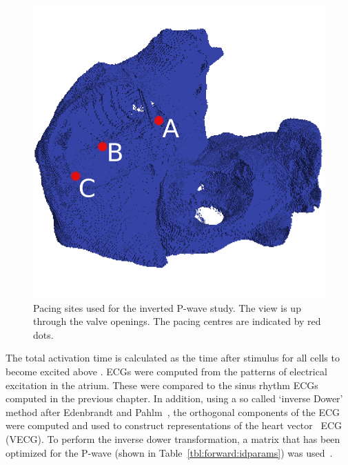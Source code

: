 \begin{figure}
\begin{center}
\includegraphics{figures/forward/inverted_p_wave/pacing_sites}
\end{center}
\caption[Pacing Sites Along The CT]{
\label{fig:forward:inverse:ct_sites}
Pacing sites used for the inverted P-wave study.
The view is up through the valve openings.
The pacing centres are indicated by red dots.
}
\end{figure}

The total activation time is calculated as the time after stimulus for all cells
to become excited above .
ECGs were computed from the patterns of electrical excitation in the atrium.
These were compared to the sinus rhythm ECGs computed in the previous chapter.
In addition, using a so called `inverse Dower' method after Edenbrandt and
Pahlm~\cite{Edenbrandt1988}, the orthogonal components of the ECG were computed
and used to construct representations of the heart
vector~\cite{Frank1956,MacFarlane1989a} ECG (VECG).
To perform the inverse dower transformation, a matrix that has been optimized for
the P-wave (shown in Table~\ref{tbl:forward:idparams}) was
used~\cite{Guillem2008}.


